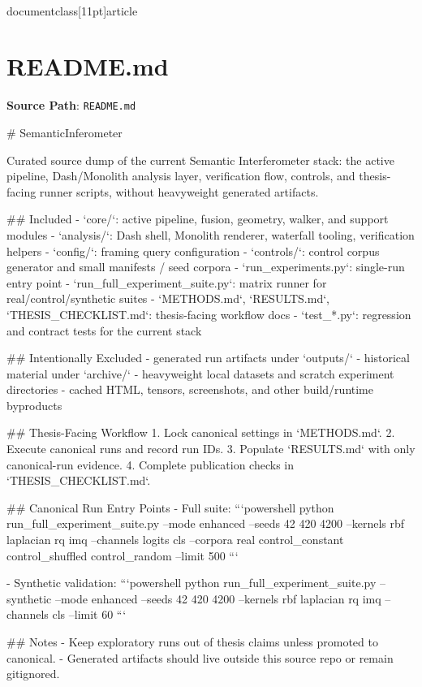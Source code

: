 \\documentclass[11pt]{article}
\begin{document}
\section*{README.md}
\textbf{Source Path}: \texttt{README.md}\par
\bigskip
\begin{CodeBlock}
# SemanticInferometer

Curated source dump of the current Semantic Interferometer stack: the active pipeline, Dash/Monolith analysis layer, verification flow, controls, and thesis-facing runner scripts, without heavyweight generated artifacts.

## Included
- `core/`: active pipeline, fusion, geometry, walker, and support modules
- `analysis/`: Dash shell, Monolith renderer, waterfall tooling, verification helpers
- `config/`: framing query configuration
- `controls/`: control corpus generator and small manifests / seed corpora
- `run_experiments.py`: single-run entry point
- `run_full_experiment_suite.py`: matrix runner for real/control/synthetic suites
- `METHODS.md`, `RESULTS.md`, `THESIS_CHECKLIST.md`: thesis-facing workflow docs
- `test_*.py`: regression and contract tests for the current stack

## Intentionally Excluded
- generated run artifacts under `outputs/`
- historical material under `archive/`
- heavyweight local datasets and scratch experiment directories
- cached HTML, tensors, screenshots, and other build/runtime byproducts

## Thesis-Facing Workflow
1. Lock canonical settings in `METHODS.md`.
2. Execute canonical runs and record run IDs.
3. Populate `RESULTS.md` with only canonical-run evidence.
4. Complete publication checks in `THESIS_CHECKLIST.md`.

## Canonical Run Entry Points
- Full suite:
```powershell
python run_full_experiment_suite.py --mode enhanced --seeds 42 420 4200 --kernels rbf laplacian rq imq --channels logits cls --corpora real control_constant control_shuffled control_random --limit 500
```

- Synthetic validation:
```powershell
python run_full_experiment_suite.py --synthetic --mode enhanced --seeds 42 420 4200 --kernels rbf laplacian rq imq --channels cls --limit 60
```

## Notes
- Keep exploratory runs out of thesis claims unless promoted to canonical.
- Generated artifacts should live outside this source repo or remain gitignored.

\end{CodeBlock}
\end{document}
